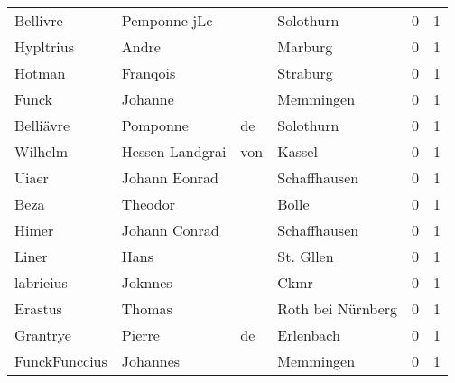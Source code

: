 \begin{center}
\begin{tiny}
\begin{longtabu}{llllrr}
                 Bellivre &                       Pemponne jLc &             &                                   Solothurn &          0 &         1 \\
                Hypltrius &                              Andre &             &                                     Marburg &          0 &         1 \\
                   Hotman &                           Franqois &             &                                    Straburg &          0 &         1 \\
                    Funck &                            Johanne &             &                                   Memmingen &          0 &         1 \\
                Belliävre &                           Pomponne &          de &                                   Solothurn &          0 &         1 \\
                  Wilhelm &                    Hessen Landgrai &         von &                                      Kassel &          0 &         1 \\
                    Uiaer &                      Johann Eonrad &             &                                Schaffhausen &          0 &         1 \\
                     Beza &                            Theodor &             &                                       Bolle &          0 &         1 \\
                    Himer &                      Johann Conrad &             &                                Schaffhausen &          0 &         1 \\
                    Liner &                               Hans &             &                                   St. Gllen &          0 &         1 \\
                labrieius &                            Joknnes &             &                                        Ckmr &          0 &         1 \\
                  Erastus &                             Thomas &             &                           Roth bei Nürnberg &          0 &         1 \\
                 Grantrye &                             Pierre &          de &                                   Erlenbach &          0 &         1 \\
            FunckFunccius &                           Johannes &             &                                   Memmingen &          0 &         1 \\

\end{longtabu}
\end{tiny}
\end{center}

